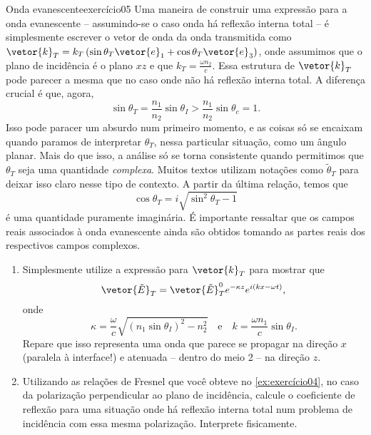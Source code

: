 \begin{exercício}{Onda evanescente}{exercício05}
    Uma maneira de construir uma expressão para a onda evanescente -- assumindo-se o caso onda há reflexão interna total -- é simplesmente escrever o vetor de onda da onda transmitida como \(\vetor{k}_T = k_T\left(\sin\theta_T \vetor{e}_1 + \cos\theta_T\vetor{e}_3\right)\), onde assumimos que o plano de incidência é o plano \(xz\) e que \(k_T = \frac{\omega n_2}{c}\). Essa estrutura de \(\vetor{k}_T\) pode parecer a mesma que no caso onde não há reflexão interna total. A diferença crucial é que, agora,
    \begin{equation*}
        \sin\theta_T = \frac{n_1}{n_2} \sin\theta_I > \frac{n_1}{n_2} \sin\theta_c = 1.
    \end{equation*}
    Isso pode paracer um absurdo num primeiro momento, e as coisas só se encaixam quando paramos de interpretar \(\theta_T\), nessa particular situação, como um ângulo planar. Mais do que isso, a análise só se torna consistente quando permitimos que \(\theta_T\) seja uma quantidade \emph{complexa}. Muitos textos utilizam notações como \(\tilde{\theta}_T\) para deixar isso claro nesse tipo de contexto. A partir da última relação, temos que
    \begin{equation*}
        \cos\theta_T = i \sqrt{\sin^2\theta_T - 1}
    \end{equation*}
    é uma quantidade puramente imaginária. É importante ressaltar que os campos reais associados à onda evanescente ainda são obtidos tomando as partes reais dos respectivos campos complexos.
    \begin{enumerate}[label=(\alph*)]
        \item Simplesmente utilize a expressão para \(\vetor{k}_T\) para mostrar que
            \begin{equation*}
                \vetor{\tilde{E}}_T = \vetor{\tilde{E}}_T^0 e^{- \kappa z} e^{i(kx - \omega t)},
            \end{equation*}
            onde
            \begin{equation*}
                \kappa = \frac{\omega}{c}\sqrt{(n_1\sin\theta_I)^2 - n_2^2}\quad\text{e}\quad
                k = \frac{\omega n_1}{c}\sin\theta_I.
            \end{equation*}
            Repare que isso representa uma onda que parece se propagar na direção \(x\) (paralela à interface!) e atenuada -- dentro do meio 2 -- na direção \(z\).
        \item Utilizando as relações de Fresnel que você obteve no \cref{ex:exercício04}, no caso da polarização perpendicular ao plano de incidência, calcule o coeficiente de reflexão para uma situação onde há reflexão interna total num problema de incidência com essa mesma polarização. Interprete fisicamente.

\end{enumerate}
\end{exercício}
